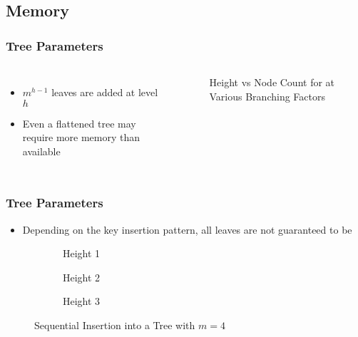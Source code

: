 \documentclass{beamer}
\begin{document}



\subsection{Memory}

\begin{frame}
	\frametitle{Tree Parameters}
	\begin{columns}
		\begin{itemize}
			\item $m^{h-1}$ leaves are added at level $h$
			\item Even a flattened tree may require more memory than available
		\end{itemize}

		\begin{figure}
			\centering
			\resizebox{\textwidth}{!}{}
			\caption{Height vs Node Count for at Various Branching Factors}
		\end{figure}
	\end{columns}
\end{frame}

\begin{frame}
	\frametitle{Tree Parameters}
	\begin{itemize}
		\item Depending on the key insertion pattern, all leaves are not
		guaranteed to be 
	\end{itemize}
	\begin{figure}
		\centering
		\begin{subfigure}{6em}
			\centering
			\resizebox{0.6\textwidth}{!}{}
			\caption{Height 1}
		\end{subfigure}
		\begin{subfigure}{15em}
			\centering
			\resizebox{0.7\textwidth}{!}{}
			\caption{Height 2}
		\end{subfigure}
		\begin{subfigure}{\textwidth}
			\centering
			\resizebox{\textwidth}{!}{}
			\caption{Height 3}
		\end{subfigure}
		\caption{Sequential Insertion into a Tree with $m=4$}
	\end{figure}
\end{frame}
\end{document}

